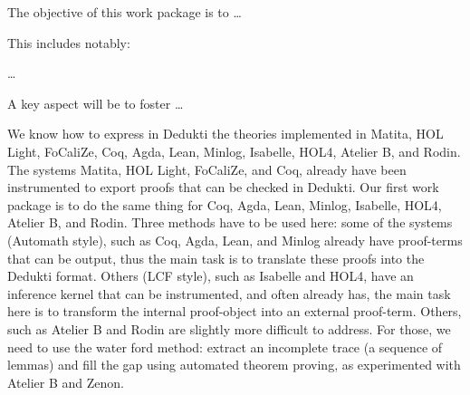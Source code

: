 \begin{workpackage}[id=instrumentation,wphases=0-48,
  short=Instrument Provers,%
  title=Instrument proof systems to produce Dedukti proof,
  lead=ISa,
  ISaRM=10]
  

\begin{wpobjectives}
  The objective of this work package is to \ldots

This includes notably:
  \begin{compactitem}
  \item \ldots
  \end{compactitem}
  A key aspect will be to foster \ldots
\end{wpobjectives}


\begin{wpdescription}
We know how to express in Dedukti the theories implemented in Matita,
HOL Light, FoCaliZe, Coq, Agda, Lean, Minlog, Isabelle, HOL4,
Atelier B, and Rodin. The systems Matita, HOL Light, FoCaliZe, and
Coq, already have been instrumented to export proofs that can be
checked in Dedukti. Our first work package is to do the same thing for
Coq, Agda, Lean, Minlog, Isabelle, HOL4, Atelier B, and
Rodin. Three methods have to be used here: some of the systems
(Automath style), such as Coq, Agda, Lean, and Minlog already have
proof-terms that can be output, thus the main task is to translate
these proofs into the Dedukti format. Others (LCF style), such as
Isabelle and HOL4, have an inference kernel that can be
instrumented, and often already has, the main task here is to transform
the internal proof-object into an external proof-term. Others, such as
Atelier B and Rodin are slightly more difficult to address. For those,
we need to use the water ford method: extract an incomplete trace (a
sequence of lemmas) and fill the gap using automated theorem proving,
as experimented with Atelier B and Zenon.
\end{wpdescription}

\begin{tasklist}
\begin{task}[id=agda,title=instrument Agda]

\end{task}


\end{tasklist}
\end{workpackage}
